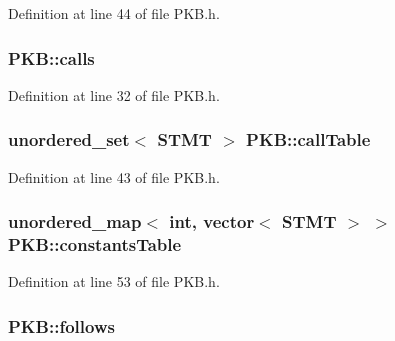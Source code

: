 Definition at line 44 of file P\-K\-B.\-h.

\hypertarget{class_p_k_b_a7876c3653d636ee8a726941d0f98e3ae}{
\subsubsection[{calls}]{ P\-K\-B\-::calls\hspace{0.3cm}{\ttfamily [static]}}}\label{class_p_k_b_a7876c3653d636ee8a726941d0f98e3ae}


Definition at line 32 of file P\-K\-B.\-h.

\hypertarget{class_p_k_b_a4df9c934e4846c58863ed3513a1ff34a}{
\subsubsection[{call\-Table}]{\setlength{\rightskip}{0pt plus 5cm}unordered\-\_\-set$<$ {\bf S\-T\-M\-T} $>$ P\-K\-B\-::call\-Table\hspace{0.3cm}{\ttfamily [static]}}}\label{class_p_k_b_a4df9c934e4846c58863ed3513a1ff34a}


Definition at line 43 of file P\-K\-B.\-h.

\hypertarget{class_p_k_b_a3354b7bf1c997e868b9273e5d19d673e}{
\subsubsection[{constants\-Table}]{\setlength{\rightskip}{0pt plus 5cm}unordered\-\_\-map$<$ int, vector$<$ {\bf S\-T\-M\-T} $>$ $>$ P\-K\-B\-::constants\-Table\hspace{0.3cm}{\ttfamily [static]}}}\label{class_p_k_b_a3354b7bf1c997e868b9273e5d19d673e}


Definition at line 53 of file P\-K\-B.\-h.

\hypertarget{class_p_k_b_a93dcc37be7f8e851ff4317925c07a9f5}{
\subsubsection[{follows}]{ P\-K\-B\-::follows\hspace{0.3cm}{\ttfamily [static]}}}\label{class_p_k_b_a93dcc37be7f8e851ff4317925c07a9f5}


